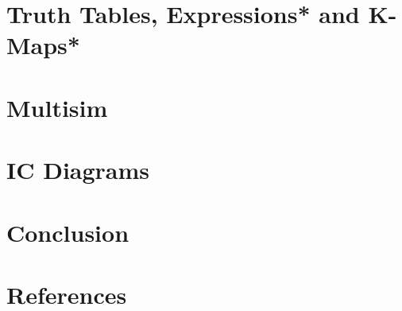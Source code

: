 \documentclass[12pt]{report}
\begin{document}
{\section{Truth Tables, Expressions* and K-Maps*} 


\section{Multisim} 


\section{IC Diagrams} 


\section{Conclusion} 


\newpage
\section*{References}

}
\end{document}
